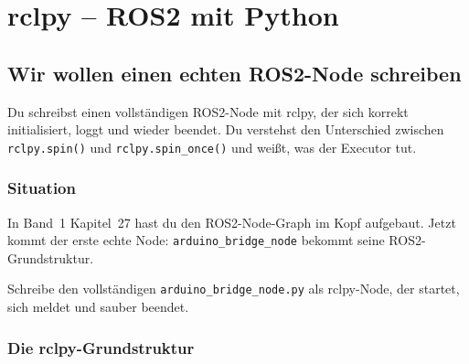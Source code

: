 
\part{rclpy -- ROS2 mit Python}

\chapter{Wir wollen einen echten ROS2-Node schreiben}

\begin{lernziele}
Du schreibst einen vollständigen ROS2-Node mit rclpy,
der sich korrekt initialisiert, loggt und wieder beendet.
Du verstehst den Unterschied zwischen \texttt{rclpy.spin()} und
\texttt{rclpy.spin\_once()} und weißt, was der Executor tut.
\end{lernziele}

\section{Situation}

In Band~1 Kapitel~27 hast du den ROS2-Node-Graph im Kopf aufgebaut.
Jetzt kommt der erste echte Node:
\texttt{arduino\_bridge\_node} bekommt seine ROS2-Grundstruktur.

\begin{aufgabeBox}
Schreibe den vollständigen \texttt{arduino\_bridge\_node.py}
als rclpy-Node, der startet, sich meldet und sauber beendet.
\end{aufgabeBox}

\section{Die rclpy-Grundstruktur}

